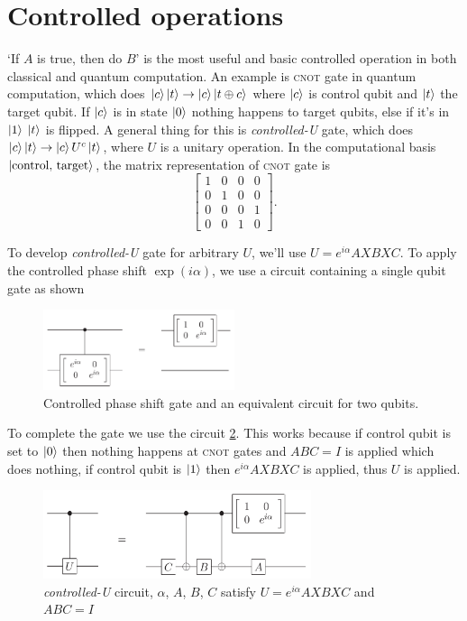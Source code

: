\section{Controlled operations}
`If $A$ is true, then do $B$' is the most useful and basic controlled operation in both classical and quantum computation. An example is \textsc{cnot} gate in quantum computation, which does $\ket{c}\ket{t}\rightarrow \ket{c}\ket{t\oplus c}$ where $\ket{c}$ is control qubit and $\ket{t}$ the target qubit. If $\ket{c}$ is in state $\ket{0}$ nothing happens to target qubits, else if it's in $\ket{1}$ $\ket{t}$ is flipped. A general thing for this is \textit{controlled-U} gate, which does $\ket{c}\ket{t}\rightarrow \ket{c}U^c\ket{t}$, where $U$ is a unitary operation. In the computational basis $\ket{\text{control, target}}$, the matrix representation of \textsc{cnot} gate is
\begin{equation}
    \begin{bmatrix}
        1 & 0 & 0 & 0 \\
        0 & 1 & 0 & 0 \\
        0 & 0 & 0 & 1 \\
        0 & 0 & 1 & 0
    \end{bmatrix}.
\end{equation}

To develop \textit{controlled-U} gate for arbitrary $U$, we'll use $U=e^{i\alpha}AXBXC$. To apply the controlled phase shift $\exp{(i\alpha)}$, we use a circuit containing a single qubit gate as shown
\begin{figure}[H]
    \centering
    \includegraphics[width=0.5\textwidth]{images/phase_shift_circuit.png}
    \caption{Controlled phase shift gate and an equivalent circuit for two qubits.}
    \label{fig:phase-shift-circuit}
\end{figure}

To complete the gate we use the circuit \ref{fig:controlled-u-circuit}. This works because if control qubit is set to $\ket{0}$ then nothing happens at \textsc{cnot} gates and $ABC=I$ is applied which does nothing, if control qubit is $\ket{1}$ then $e^{i\alpha}AXBXC$ is applied, thus $U$ is applied. 
\begin{figure}[H]
    \centering
    \includegraphics[width=0.7\textwidth]{images/controlled_u_circuit.png}
    \caption{\textit{controlled-U} circuit, $\alpha$, $A$, $B$, $C$ satisfy $U=e^{i\alpha}AXBXC$ and $ABC=I$}
    \label{fig:controlled-u-circuit}
\end{figure}

